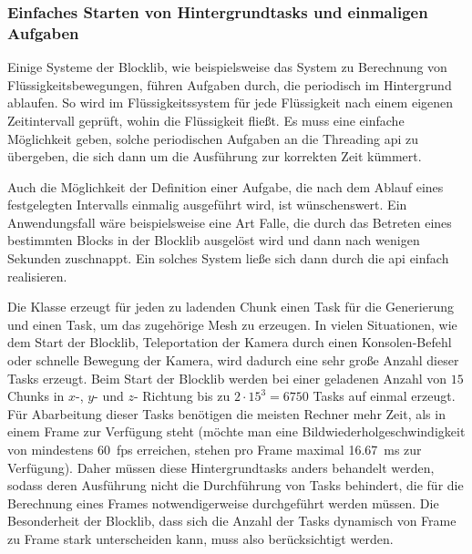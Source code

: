 \subsubsection{Einfaches Starten von Hintergrundtasks und einmaligen Aufgaben}\label{sec:reqBackgroundTasks}
Einige Systeme der Blocklib, wie beispielsweise das System zu Berechnung von Flüssigkeitsbewegungen, führen Aufgaben durch, die periodisch im Hintergrund ablaufen. So wird im Flüssigkeitssystem für jede Flüssigkeit nach einem eigenen Zeitintervall geprüft, wohin die Flüssigkeit fließt. Es muss eine einfache Möglichkeit geben, solche periodischen Aufgaben an die Threading \acs{api} zu übergeben, die sich dann um die Ausführung zur korrekten Zeit kümmert.

Auch die Möglichkeit der Definition einer Aufgabe, die nach dem Ablauf eines festgelegten Intervalls einmalig ausgeführt wird, ist wünschenswert. Ein Anwendungsfall wäre beispielsweise eine Art Falle, die durch das Betreten eines bestimmten Blocks in der Blocklib ausgelöst wird und dann nach wenigen Sekunden zuschnappt. Ein solches System ließe sich dann durch die \acs{api} einfach realisieren.

Die Klasse \classChunkStorage{} erzeugt für jeden zu ladenden Chunk einen Task für die Generierung und einen Task, um das zugehörige Mesh zu erzeugen. In vielen Situationen, wie dem Start der Blocklib, Teleportation der Kamera durch einen Konsolen-Befehl oder schnelle Bewegung der Kamera, wird dadurch eine sehr große Anzahl dieser Tasks erzeugt. Beim Start der Blocklib werden bei einer geladenen Anzahl von $15$ Chunks in  $x$-, $y$- und $z$- Richtung bis zu $2\cdot15^3=6750$  Tasks auf einmal erzeugt. Für Abarbeitung dieser Tasks benötigen die meisten Rechner mehr Zeit, als in einem Frame zur Verfügung steht (möchte man eine Bildwiederholgeschwindigkeit von mindestens 60~\ac{fps} erreichen, stehen pro Frame maximal \SI{16,67}{\milli\second} zur Verfügung). Daher müssen diese Hintergrundtasks anders behandelt werden, sodass deren Ausführung nicht die Durchführung von Tasks behindert, die für die Berechnung eines Frames notwendigerweise durchgeführt werden müssen. Die Besonderheit der Blocklib, dass sich die Anzahl der Tasks  dynamisch von Frame zu Frame stark unterscheiden kann, muss also berücksichtigt werden.
